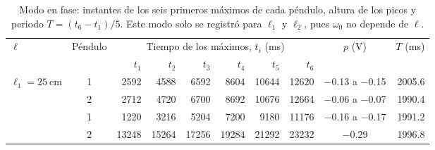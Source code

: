 
\begin{table}[ht]
\centering
\caption{Modo en fase: instantes de los seis primeros máximos de cada péndulo, altura de los picos y periodo $T=(t_6-t_1)/5$. Este modo solo se registró para $\ell_1$ y $\ell_2$, pues $\omega_0$ no depende de $\ell$.}
\label{tab:modo1}
\renewcommand{\arraystretch}{1.18}\setlength{\tabcolsep}{4.2pt}
\begin{tabular}{@{}l c *{6}{r} c r@{}}
\toprule
$\ell$ & Péndulo & \multicolumn{6}{c}{Tiempo de los máximos, $t_{i}$ (\si{\milli\second})} & $p$ (\si{\volt}) & $T$ (\si{\milli\second}) \\
\cmidrule(lr){3-8}
 & & $t_1$ & $t_2$ & $t_3$ & $t_4$ & $t_5$ & $t_6$ & & \\
\midrule
\multirow{2}{*}{$\ell_{1}=\SI{25}{\centi\meter}$} & 1 & \num{2592} & \num{4588} & \num{6592} & \num{8604} & \num{10644} & \num{12620} & $-$0.13 a $-$0.15 & \num{2005.6} \\
 & 2 & \num{2712} & \num{4720} & \num{6700} & \num{8692} & \num{10676} & \num{12664} & $-$0.06 a $-$0.07 & \num{1990.4} \\
\addlinespace[2pt]
\multirow{2}{*}{$\ell_{2}=\SI{35}{\centi\meter}$} & 1 & \num{1220} & \num{3216} & \num{5204} & \num{7200} & \num{9180} & \num{11176} & $-$0.16 a $-$0.17 & \num{1991.2} \\
 & 2 & \num{13248} & \num{15264} & \num{17256} & \num{19284}\rlap{$^{\dagger}$} & \num{21292} & \num{23232} & $-$0.29 & \num{1996.8} \\
\bottomrule
\end{tabular}
\par{}
\end{table}
